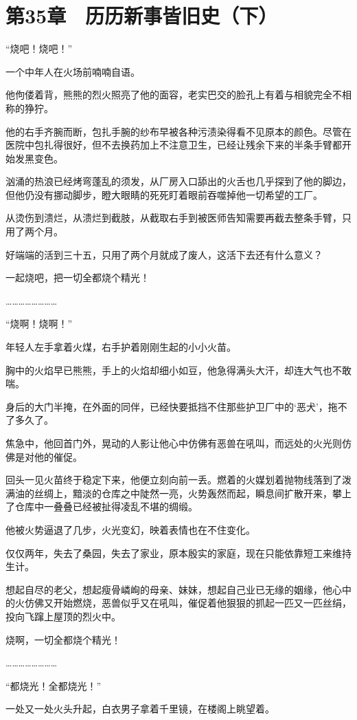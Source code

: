 \section{第35章　历历新事皆旧史（下）}

“烧吧！烧吧！”

一个中年人在火场前喃喃自语。

他佝偻着背，熊熊的烈火照亮了他的面容，老实巴交的脸孔上有着与相貌完全不相称的狰狞。

他的右手齐腕而断，包扎手腕的纱布早被各种污渍染得看不见原本的颜色。尽管在医院中包扎得很好，但不去换药加上不注意卫生，已经让残余下来的半条手臂都开始发黑变色。

汹涌的热浪已经烤弯蓬乱的须发，从厂房入口舔出的火舌也几乎探到了他的脚边，但他仍没有挪动脚步，瞪大眼睛的死死盯着眼前吞噬掉他一切希望的工厂。

从烫伤到溃烂，从溃烂到截肢，从截取右手到被医师告知需要再截去整条手臂，只用了两个月。

好端端的活到三十五，只用了两个月就成了废人，这活下去还有什么意义？

一起烧吧，把一切全都烧个精光！

……………………

“烧啊！烧啊！”

年轻人左手拿着火煤，右手护着刚刚生起的小小火苗。

胸中的火焰早已熊熊，手上的火焰却细小如豆，他急得满头大汗，却连大气也不敢喘。

身后的大门半掩，在外面的同伴，已经快要抵挡不住那些护卫厂中的‘恶犬’，拖不了多久了。

焦急中，他回首门外，晃动的人影让他心中仿佛有恶兽在吼叫，而远处的火光则仿佛是对他的催促。

回头一见火苗终于稳定下来，他便立刻向前一丢。燃着的火媒划着抛物线落到了泼满油的丝绸上，黯淡的仓库之中陡然一亮，火势轰然而起，瞬息间扩散开来，攀上了仓库中一叠叠已经被扯得凌乱不堪的绸缎。

他被火势逼退了几步，火光变幻，映着表情也在不住变化。

仅仅两年，失去了桑园，失去了家业，原本殷实的家庭，现在只能依靠短工来维持生计。

想起自尽的老父，想起瘦骨嶙峋的母亲、妹妹，想起自己业已无缘的姻缘，他心中的火仿佛又开始燃烧，恶兽似乎又在吼叫，催促着他狠狠的抓起一匹又一匹丝绢，投向飞蹿上屋顶的烈火中。

烧啊，一切全都烧个精光！

……………………

“都烧光！全都烧光！”

一处又一处火头升起，白衣男子拿着千里镜，在楼阁上眺望着。

